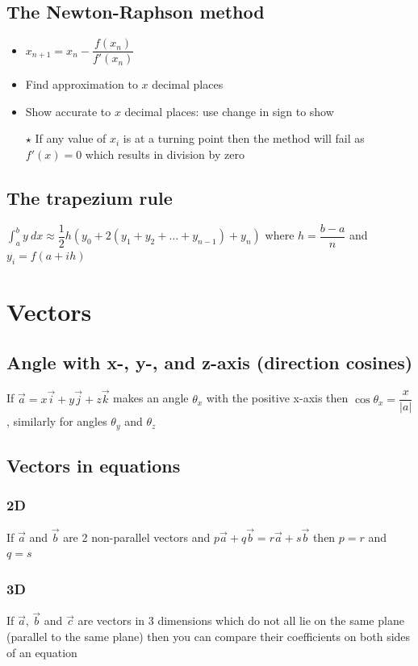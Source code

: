 \documentclass[A4paper]{article}
\begin{document}
	\subsection{The Newton-Raphson method}
	\begin{itemize}
		\item $x_{n+1}=x_n-\dfrac{f(x_n)}{f'(x_n)}$
		\item Find approximation to $x$ decimal places
		\item Show accurate to $x$ decimal places: use change in sign to show
		\item[$\star$] If any value of $x_i$ is at a turning point then the method will fail as $f'(x)=0$ which results in division by zero
	\end{itemize}
	
	\subsection{The trapezium rule}
	$\int_{a}^{b}y\:dx \approx \dfrac{1}{2} h (y_0+2(y_1+y_2+\dots+y_{n-1})+y_n)$ where $h=\dfrac{b-a}{n}$ and $y_i=f(a+ih)$


	\pagebreak

	\section{Vectors}
	\subsection{Angle with x-, y-, and z-axis (direction cosines)}
	If $\vec{a}=x\vec{i}+y\vec{j}+z\vec{k}$ makes an angle $\theta_x$ with the positive x-axis then $\cos \theta_x=\dfrac{x}{|a|}$, similarly for angles $\theta_y$ and $\theta_z$
	\subsection{Vectors in equations}
	\subsubsection{2D}
	If $\vec{a}$ and $\vec{b}$ are 2 non-parallel vectors and $p\vec{a}+q\vec{b}=r\vec{a}+s\vec{b}$ then $p=r$ and $q=s$
	\subsubsection{3D}
	If $\vec{a}$, $\vec{b}$ and $\vec{c}$ are vectors in 3 dimensions which do not all lie on the same plane (parallel to the same plane) then you can compare their coefficients on both sides of an equation

	
\end{document}
